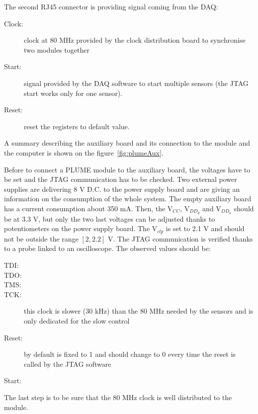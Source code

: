   The second RJ45 connector is providing signal coming from the DAQ:
  \begin{description}
    \item[Clock:] clock at 80 MHz provided by the clock distribution board to synchronise two modules together
    \item[Start:] signal provided by the DAQ software to start multiple sensors (the JTAG start works only for one sensor).
    \item[Reset:] reset the registers to default value. 
  \end{description}

  A summary describing the auxiliary board and its connection to the module and the computer is shown on the figure~\ref{fig:plumeAux}.

  Before to connect a PLUME module to the auxiliary board, the voltages have to be set and the JTAG communication has to be checked.
  Two external power supplies are delivering 8 V D.C. to the power supply board and are giving an information on the consumption of the whole system.
  The empty auxiliary board has a current consumption about 350 mA.
  Then, the $\text{V}_{CC}$, $\text{V}_{DD_d}$ and $\text{V}_{DD_a}$ should be at 3.3 V, but only the two last voltages can be adjusted thanks to potentiometers on the power supply board.
  The $\text{V}_{clp}$ is set to 2.1 V and should not be outside the range $\left[2, 2.2\right]$ V.
  The JTAG communication is verified thanks to a probe linked to an oscilloscope.
  The observed values should be:

  \begin{description}
    \item[TDI:]
    \item[TDO:]
    \item[TMS:]
    \item[TCK:] this clock is slower (30 kHz) than the 80 MHz needed by the sensors and is only dedicated for the slow control
    \item[Reset:] by default is fixed to 1 and should change to 0 every time the reset is called by the JTAG software
    \item[Start:] 
  \end{description}

  The last step is to be sure that the 80 MHz clock is well distributed to the module.


